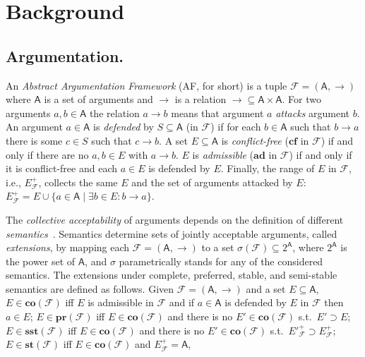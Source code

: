 \documentclass[conference]{IEEEtran}
\newcommand{\powerset}[1]{\ensuremath{2^{#1}}} %
\newcommand{\AF}{\ensuremath{\mathcal{F}}\xspace} %
\newcommand{\F}{\ensuremath{\mathcal{F}}\xspace} %
\newcommand{\args}{\ensuremath{\mathsf{A}}\xspace} %
\newcommand{\atts}{\ensuremath{\rightarrow}\xspace}
\newcommand{\attackers}[2]{\ensuremath{\mathcal{F}_{#1}(#2)\xspace}} %
\newcommand{\AFC}{\ensuremath{\AF=(\args,\atts)}\xspace} %
\newcommand{\cA}{\ensuremath{\mathcal{A}}} %
\newcommand{\cB}{\ensuremath{\mathcal{B}}} %
\newcommand{\cC}{\ensuremath{\mathcal{C}}} %
\newcommand{\af}{AF}
\newcommand{\cf}{\mathbf{cf}}
\newcommand{\ad}{\mathbf{ad}}
\newcommand{\co}{\mathbf{co}}
\newcommand{\pr}{\mathbf{pr}}
\newcommand{\st}{\mathbf{st}}
\newcommand{\sst}{\mathbf{sst}}
\begin{document}
\section{Background}\label{sect:background}


\subsection{Argumentation.}\label{sect:bgarg} An \emph{Abstract Argumentation Framework} (\af, for short) \cite{Dung:1995}
is a tuple $\F=(\args,\atts)$ where
\args is a set of arguments and
\atts is a relation $\atts\subseteq \args\times\args$.
For two arguments $a,b\in\args$ the relation $a \atts b$ means that argument $a$ \emph{attacks} argument $b$.
An argument $a \in \args$ is \emph{defended} by $S \subseteq \args$ (in $\F$)
if for each $b \in \args$ such that $b \atts a$
there is some $c \in S$ such that $c \atts b$.
A set $E \subseteq \args$ is \emph{conflict-free} ($\cf$ in \F) if and only if there are no $a,b\in E$ with $a \atts b$.
$E$ is \emph{admissible} ($\ad$ in \F) if and only if it is conflict-free and each $a \in E$ is defended by $E$.
Finally, the range of $E$ in $\F$, i.e., $E^{+}_\F$, collects the same $E$ and the set of arguments attacked by $E$: $E^{+}_\F=E \cup \{a\in\args \mid \exists b\in E: b \atts a\}$.


The \emph{collective acceptability} of  arguments depends on the definition of
different \textit{semantics}~\cite{Dung:1995}.  Semantics determine
sets of jointly acceptable arguments, called \emph{extensions}, by
mapping each \AFC to a set $\sigma(\F) \subseteq \powerset{\args}$, where $\powerset{\args}$ is the  power set of $\args$, and $\sigma$ parametrically stands for any of the considered semantics.
The extensions under complete, preferred, stable,  and semi-stable
semantics are defined as follows.
Given \AFC and a set $E \subseteq \args$, $E \in \co(\F)$ iff $E$ is admissible in $\F$ and if $a \in \args$ is defended by $E$ in $\F$ then $a\in E$;  $E \in \pr(\F)$ iff $E \in \co(\F)$ and there is no $E' \in \co(\F)$ s.t.\ $E' \supset E$; $E \in \sst(\F)$ iff $E \in \co(\F)$ and there is no $E' \in \co(\F)$ s.t.\ $E'^+_\F \supset E^+_\F$; $E \in \st(\F)$ iff $E \in \co(\F)$ and $E^+_\F = \args$,
\end{document}
